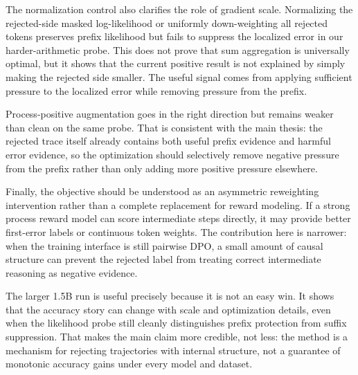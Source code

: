 The normalization control also clarifies the role of gradient scale. Normalizing the rejected-side masked log-likelihood or uniformly down-weighting all rejected tokens preserves prefix likelihood but fails to suppress the localized error in our harder-arithmetic probe. This does not prove that sum aggregation is universally optimal, but it shows that the current positive result is not explained by simply making the rejected side smaller. The useful signal comes from applying sufficient pressure to the localized error while removing pressure from the prefix.

Process-positive augmentation goes in the right direction but remains weaker than clean \cmdpo{} on the same probe. That is consistent with the main thesis: the rejected trace itself already contains both useful prefix evidence and harmful error evidence, so the optimization should selectively remove negative pressure from the prefix rather than only adding more positive pressure elsewhere.

Finally, the objective should be understood as an asymmetric reweighting intervention rather than a complete replacement for reward modeling. If a strong process reward model can score intermediate steps directly, it may provide better first-error labels or continuous token weights. The contribution here is narrower: when the training interface is still pairwise DPO, a small amount of causal structure can prevent the rejected label from treating correct intermediate reasoning as negative evidence.

The larger 1.5B run is useful precisely because it is not an easy win. It shows that the accuracy story can change with scale and optimization details, even when the likelihood probe still cleanly distinguishes prefix protection from suffix suppression. That makes the main claim more credible, not less: the method is a mechanism for rejecting trajectories with internal structure, not a guarantee of monotonic accuracy gains under every model and dataset.
